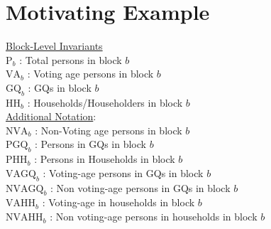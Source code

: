 \documentclass[12pt]{amsart}
\begin{document}
\section{Motivating Example}

\noindent \underline{Block-Level Invariants} \\
$\text{P}_b$ : Total persons in block $b$ \\
$\text{VA}_b$ : Voting age persons in block $b$\\
$\text{GQ}_b$ : GQs in block $b$\\
$\text{HH}_b$ : Households/Householders in block $b$ \\


\noindent \underline{Additional Notation}:\\
$\text{NVA}_b$ : Non-Voting age persons in block $b$  \\
$\text{PGQ}_b$ : Persons in GQs in block $b$ \\
$\text{PHH}_b$ : Persons in Households in block $b$  \\
$\text{VAGQ}_b$ : Voting-age persons in GQs in block $b$  \\
$\text{NVAGQ}_b$ : Non voting-age persons in GQs in block $b$  \\
$\text{VAHH}_b$ : Voting-age in households in block $b$  \\
$\text{NVAHH}_b$ : Non voting-age persons in households in block $b$\\
\end{document}
